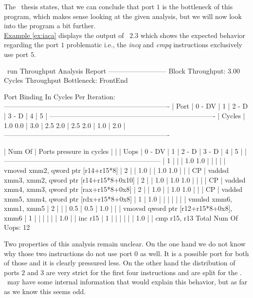 The \osaca\ thesis states, that we can conclude that port $1$ is the bottleneck of this program, which makes sense looking at the given analysis, but we will now look into the program a bit further.\\
\hyperref[ex:iaca]{Example \ref*{ex:iaca}} displays the output of \iaca\ $2.3$ which shows the expected behavior regarding the port $1$ problematic i.e., the \emph{incq} and \emph{cmpq} instructions exclusively use port $5$.

\begin{LabeledExample}{\iaca\ run}{\label{ex:iaca}}
  Throughput Analysis Report
  --------------------------
  Block Throughput: 3.00 Cycles       Throughput Bottleneck: FrontEnd
  
  Port Binding In Cycles Per Iteration:
  -------------------------------------------------------------------------
  |  Port  |  0   -  DV  |  1   |  2   -  D   |  3   -  D   |  4   |  5   |
  -------------------------------------------------------------------------
  | Cycles | 1.0    0.0  | 3.0  | 2.5    2.0  | 2.5    2.0  | 1.0  | 2.0  |
  -------------------------------------------------------------------------
  
      
  | Num Of |              Ports pressure in cycles               |    |
  |  Uops  |  0  - DV  |  1  |  2  -  D  |  3  -  D  |  4  |  5  |    |
  ---------------------------------------------------------------------
  |   1    |           |     | 1.0   1.0 |           |     |     |    | vmovsd xmm2, qword ptr [r14+r15*8]
  |   2    |           | 1.0 |           | 1.0   1.0 |     |     | CP | vaddsd xmm3, xmm2, qword ptr [r14+r15*8+0x10]
  |   2    |           | 1.0 | 1.0   1.0 |           |     |     | CP | vaddsd xmm4, xmm3, qword ptr [rax+r15*8+0x8]
  |   2    |           | 1.0 |           | 1.0   1.0 |     |     | CP | vaddsd xmm5, xmm4, qword ptr [rdx+r15*8+0x8]
  |   1    | 1.0       |     |           |           |     |     |    | vmulsd xmm6, xmm1, xmm5
  |   2    |           |     | 0.5       | 0.5       | 1.0 |     |    | vmovsd qword ptr [r12+r15*8+0x8], xmm6
  |   1    |           |     |           |           |     | 1.0 |    | inc r15
  |   1    |           |     |           |           |     | 1.0 |    | cmp r15, r13
  Total Num Of Uops: 12
\end{LabeledExample}

Two properties of this analysis remain unclear. On the one hand we do not know why those two instructions do not use port $0$ as well. It is a possible port for both of those and it is clearly pressured less. On the other hand the distribution of ports $2$ and $3$ are very strict for the first four instructions and are split for the . \iaca\ may have some internal information that would explain this behavior, but as far as we know this seems odd.\\

